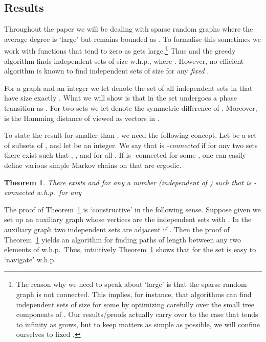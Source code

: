 \documentclass[a4paper,10pt]{article}
\newtheorem{theorem}{Theorem}\renewcommand{\thetheorem}{\arabic{theorem}}
\newcommand{\whp}{w.h.p.}
\newcommand\Thm{Theorem}
\begin{document}
\subsection{Results}\label{sec:Results}

Throughout the paper we will be dealing with sparse random graphs 
where the average degree  is `large' but remains bounded
as . To formalise this sometimes we work 
with functions  that tend to zero as  gets large.\footnote{The reason why we need to speak about  `large' is
	that 	the sparse random graph  is not connected. This
	implies, for instance, that algorithms can find independent sets
	of size  for some  by optimizing
	carefully over the small tree components of . Our
	results/proofs actually carry over to the case that  tends
	to infinity as  grows, but to keep matters as simple as possible,
	we will	confine ourselves to fixed .}
Thus  and the greedy
algorithm finds independent sets of size  \whp, where . However, no efficient
algorithm is known to find independent sets of size  for any \emph{fixed} .


For a graph  and an integer  we let  denote the set
of all independent sets in  that have size exactly . What we
will show is that in  the set  undergoes a
phase transition as . For two sets  we let  denote the symmetric difference of .
Moreover,  is the Hamming distance of
 viewed as vectors in .


To state the result for  smaller than , we need
the following concept. Let  be a set of subsets of , and
let  be an integer. We say that  is {\em -connected}
if for any two sets  there exist 
such that , , and 
for all . If  is -connected for
some , one can easily define various simple Markov
chains on  that are ergodic.

\begin{theorem}\label{thrm:Connectivity}
There exists  and for any  a number  (independent
of ) such that  is -connected \whp\
for any
	
\end{theorem}


\noindent
The proof of \Thm~\ref{thrm:Connectivity} is `constructive' in the
following sense. Suppose given  we set up an auxiliary
graph whose vertices are the independent sets  with
. In the auxiliary graph
two independent sets  are adjacent if
. Then the proof of \Thm~\ref{thrm:Connectivity}
yields an algorithm  for finding paths of length  between
any two elements of  \whp\ Thus, intuitively \Thm~\ref{thrm:Connectivity}
shows that for  the set
 is easy to `navigate' \whp
\end{document}
